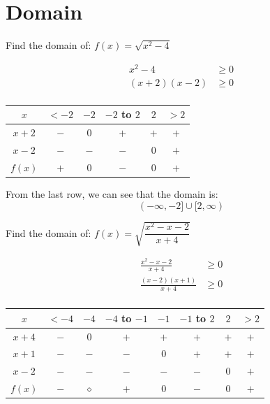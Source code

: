 \documentclass[fleqn,addpoints]{exam}
\begin{document}
\begin{questions}
\begin{parts}
\end{parts}

\ifprintanswers
\else
\pagebreak
\fi

\section{Domain}

\question[5] 
Find the domain of: $f(x) = \sqrt{x^2-4}$
\begin{solution}[6 cm]
\begin{align*}
  x^2 - 4 &\geq 0 \\
  (x+2)(x-2) &\geq 0 \\
\end{align*}

\begin{tabular}{|c|c|c|c|c|c|}
\hline
  $x$     &  $< -2$ & $-2$ & $-2$ to $2$ & $2$ & $>2$ \\
\hline
\hline
  $x + 2$ &  $-$    & $0$  & $+$         & $+$ & $+$  \\
\hline
  $x-2$   &  $-$    & $-$  & $-$         & $0$ & $+$  \\
\hline
\hline
  $f(x)$  &  $+$    & 0    & $-$         & 0   & $+$  \\
\hline
\end{tabular}

From the last row, we can see that the domain is:  
\[
  (-\infty, -2] \cup [2, \infty)
\]
\end{solution}

\ifprintanswers
\pagebreak
\fi

\question[7] 
Find the domain of: $f(x) = \sqrt{\dfrac{x^2-x-2}{x+4}}$
\begin{solution}[5 cm]
\begin{align*}
  \frac{x^2-x-2}{x+4} &\geq 0 \\
  \frac{(x-2)(x+1)}{x+4} &\geq 0 \\
\end{align*}

\begin{tabular}{|c|c|c|c|c|c|c|c|}
\hline
  $x$     & $<-4$ & $-4$ & $-4$ to $-1$ & $-1$ & $-1$ to $2$ & $2$ & $>2$ \\
\hline
\hline
  $x + 4$ & $-$   & $0$    & $+$          & $+$ & $+$          & $+$ & $+$  \\
\hline
  $x + 1$ & $-$   & $-$    & $-$          & $0$ & $+$          & $+$ & $+$  \\
\hline
  $x - 2$ & $-$   & $-$    & $-$          & $-$ & $-$          & $0$ & $+$  \\
\hline
\hline
  $f(x)$  & $-$   & $\diamond$ & $+$          & $0$ & $-$          & $0$ & $+$  \\
\hline
\end{tabular}


\end{solution}
\end{questions}
\end{document}

